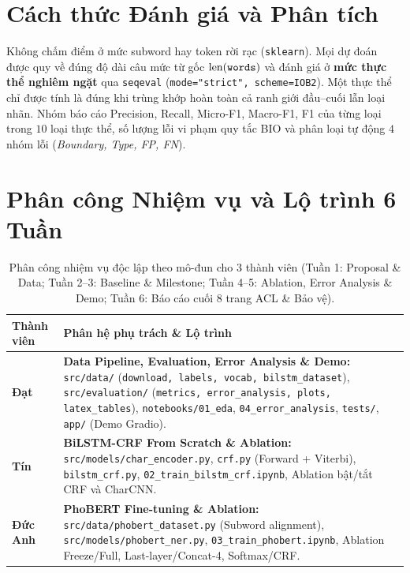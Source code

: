 \documentclass[11pt,a4paper,twocolumn]{article}
\begin{document}
\section{Cách thức Đánh giá và Phân tích}
Không chấm điểm ở mức subword hay token rời rạc (\texttt{sklearn}). Mọi dự đoán được quy về đúng độ dài câu mức từ gốc $\text{len}(\text{\texttt{words}})$ và đánh giá ở \textbf{mức thực thể nghiêm ngặt} qua \texttt{seqeval} (\texttt{mode="strict", scheme=IOB2}). Một thực thể chỉ được tính là đúng khi trùng khớp hoàn toàn cả ranh giới đầu--cuối lẫn loại nhãn. Nhóm báo cáo Precision, Recall, Micro-F1, Macro-F1, F1 của từng loại trong $10$ loại thực thể, số lượng lỗi vi phạm quy tắc BIO và phân loại tự động $4$ nhóm lỗi (\textit{Boundary, Type, FP, FN}).

\section{Phân công Nhiệm vụ và Lộ trình 6 Tuần}

\begin{table}[h]
\centering
\small
\begin{tabular}{p{1.4cm}p{5.7cm}}
\hline
\textbf{Thành viên} & \textbf{Phân hệ phụ trách \& Lộ trình} \\
\hline
\textbf{Đạt} & \textbf{Data Pipeline, Evaluation, Error Analysis \& Demo:} \texttt{src/data/} (\texttt{download, labels, vocab, bilstm\_dataset}), \texttt{src/evaluation/} (\texttt{metrics, error\_analysis, plots, latex\_tables}), \texttt{notebooks/01\_eda}, \texttt{04\_error\_analysis}, \texttt{tests/}, \texttt{app/} (Demo Gradio). \\
\hline
\textbf{Tín} & \textbf{BiLSTM-CRF From Scratch \& Ablation:} \texttt{src/models/char\_encoder.py}, \texttt{crf.py} (Forward + Viterbi), \texttt{bilstm\_crf.py}, \texttt{02\_train\_bilstm\_crf.ipynb}, Ablation bật/tắt CRF và CharCNN. \\
\hline
\textbf{Đức Anh} & \textbf{PhoBERT Fine-tuning \& Ablation:} \texttt{src/data/phobert\_dataset.py} (Subword alignment), \texttt{src/models/phobert\_ner.py}, \texttt{03\_train\_phobert.ipynb}, Ablation Freeze/Full, Last-layer/Concat-4, Softmax/CRF. \\
\hline
\end{tabular}
\caption{Phân công nhiệm vụ độc lập theo mô-đun cho $3$ thành viên (Tuần 1: Proposal \& Data; Tuần 2--3: Baseline \& Milestone; Tuần 4--5: Ablation, Error Analysis \& Demo; Tuần 6: Báo cáo cuối 8 trang ACL \& Bảo vệ).}
\label{tab:prop_team}
\end{table}


\end{document}
